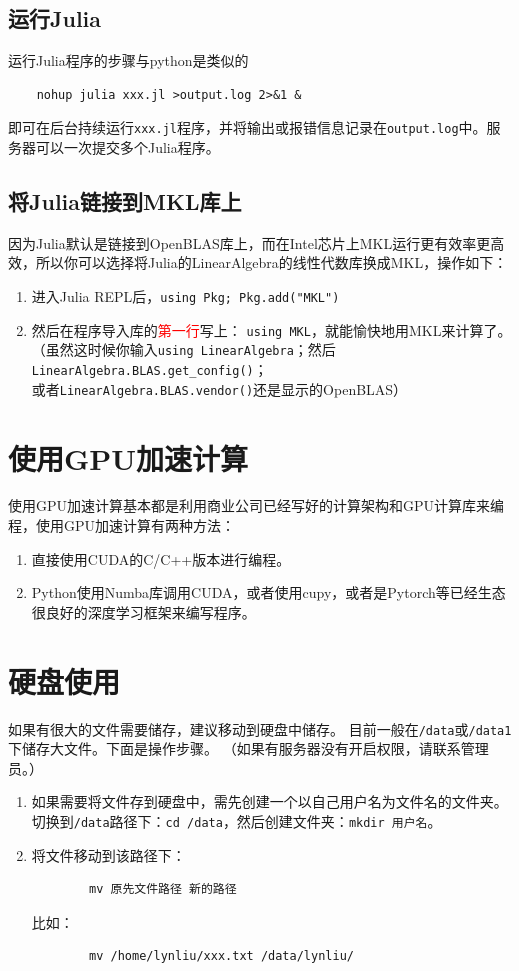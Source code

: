 \documentclass{article}
\def\mark{\textcolor{red}}
\begin{document}
\subsection{运行Julia}
运行Julia程序的步骤与python是类似的
\begin{verbatim}
    nohup julia xxx.jl >output.log 2>&1 &
\end{verbatim}
即可在后台持续运行\verb|xxx.jl|程序，并将输出或报错信息记录在\verb|output.log|中。服务器可以一次提交多个Julia程序。
\subsection{将Julia链接到MKL库上}
因为Julia默认是链接到OpenBLAS库上，而在Intel芯片上MKL运行更有效率更高效，所以你可以选择将Julia的LinearAlgebra的线性代数库换成MKL，操作如下：

\begin{enumerate}
    \item 进入Julia REPL后，\verb|using Pkg; Pkg.add("MKL")|
    \item 然后在程序导入库的\mark{第一行}写上：
    \verb|using MKL|，就能愉快地用MKL来计算了。\\
    （虽然这时候你输入\verb|using LinearAlgebra|；然后
    \verb|LinearAlgebra.BLAS.get_config()|；\\或者\verb|LinearAlgebra.BLAS.vendor()|还是显示的OpenBLAS）
\end{enumerate}

\section{使用GPU加速计算}
使用GPU加速计算基本都是利用商业公司已经写好的计算架构和GPU计算库来编程，使用GPU加速计算有两种方法：
\begin{enumerate}
    \item 直接使用CUDA的C/C++版本进行编程。
    \item Python使用Numba库调用CUDA，或者使用cupy，或者是Pytorch等已经生态很良好的深度学习框架来编写程序。
\end{enumerate}

\section{硬盘使用}
如果有很大的文件需要储存，建议移动到硬盘中储存。
目前一般在\verb|/data|或\verb|/data1|下储存大文件。下面是操作步骤。
（如果有服务器没有开启权限，请联系管理员。）
\begin{enumerate}
    \item 如果需要将文件存到硬盘中，需先创建一个以自己用户名为文件名的文件夹。
    切换到\verb|/data|路径下：\verb|cd /data|，然后创建文件夹：\verb|mkdir 用户名|。
    \item 将文件移动到该路径下：
    \begin{verbatim}
        mv 原先文件路径 新的路径
    \end{verbatim}
    比如：
    \begin{verbatim}
        mv /home/lynliu/xxx.txt /data/lynliu/
    \end{verbatim}
\end{enumerate}
\end{document}
